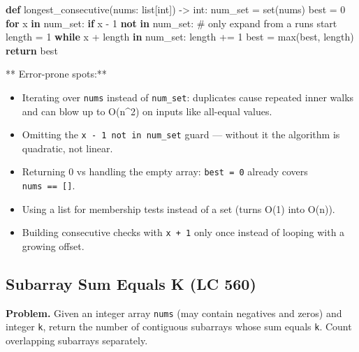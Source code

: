 \documentclass[11pt]{article}
\providecommand{\tightlist}{\setlength{\itemsep}{1pt}\setlength{\parskip}{0pt}}
\newenvironment{Shaded}{\begin{snugshade}}{\end{snugshade}}
\newcommand{\BuiltInTok}[1]{\textcolor[rgb]{0.50,0.55,0.55}{#1}}
\newcommand{\CommentTok}[1]{\textcolor[rgb]{0.48,0.49,0.49}{#1}}
\newcommand{\ControlFlowTok}[1]{\textcolor[rgb]{0.99,0.74,0.29}{\textbf{#1}}}
\newcommand{\DecValTok}[1]{\textcolor[rgb]{0.96,0.45,0.00}{#1}}
\newcommand{\KeywordTok}[1]{\textcolor[rgb]{0.81,0.81,0.76}{\textbf{#1}}}
\newcommand{\NormalTok}[1]{\textcolor[rgb]{0.81,0.81,0.76}{#1}}
\newcommand{\OperatorTok}[1]{\textcolor[rgb]{0.81,0.81,0.76}{#1}}
\begin{document}
\begin{Shaded}
\begin{Highlighting}[]
\KeywordTok{def}\NormalTok{ longest\_consecutive(nums: }\BuiltInTok{list}\NormalTok{[}\BuiltInTok{int}\NormalTok{]) }\OperatorTok{{-}\textgreater{}} \BuiltInTok{int}\NormalTok{:}
\NormalTok{    num\_set }\OperatorTok{=} \BuiltInTok{set}\NormalTok{(nums)}
\NormalTok{    best }\OperatorTok{=} \DecValTok{0}
    \ControlFlowTok{for}\NormalTok{ x }\KeywordTok{in}\NormalTok{ num\_set:}
        \ControlFlowTok{if}\NormalTok{ x }\OperatorTok{{-}} \DecValTok{1} \KeywordTok{not} \KeywordTok{in}\NormalTok{ num\_set:        }\CommentTok{\# only expand from a run\textquotesingle{}s start}
\NormalTok{            length }\OperatorTok{=} \DecValTok{1}
            \ControlFlowTok{while}\NormalTok{ x }\OperatorTok{+}\NormalTok{ length }\KeywordTok{in}\NormalTok{ num\_set:}
\NormalTok{                length }\OperatorTok{+=} \DecValTok{1}
\NormalTok{            best }\OperatorTok{=} \BuiltInTok{max}\NormalTok{(best, length)}
    \ControlFlowTok{return}\NormalTok{ best}
\end{Highlighting}
\end{Shaded}

** Error-prone spots:**

\begin{itemize}
\tightlist
\item
  Iterating over \texttt{nums} instead of \texttt{num\_set}: duplicates cause repeated inner walks and can blow up to O(n\^{}2) on inputs like all-equal values.
\item
  Omitting the \texttt{x\ -\ 1\ not\ in\ num\_set} guard --- without it the algorithm is quadratic, not linear.
\item
  Returning 0 vs handling the empty array: \texttt{best\ =\ 0} already covers \texttt{nums\ ==\ {[}{]}}.
\item
  Using a list for membership tests instead of a set (turns O(1) into O(n)).
\item
  Building consecutive checks with \texttt{x\ +\ 1} only once instead of looping with a growing offset.
\end{itemize}

\subsection{Subarray Sum Equals K (LC 560)}\label{subarray-sum-equals-k-lc-560}

\textbf{Problem.} Given an integer array \texttt{nums} (may contain negatives and zeros) and integer \texttt{k}, return the number of contiguous subarrays whose sum equals \texttt{k}. Count overlapping subarrays separately.
\end{document}
